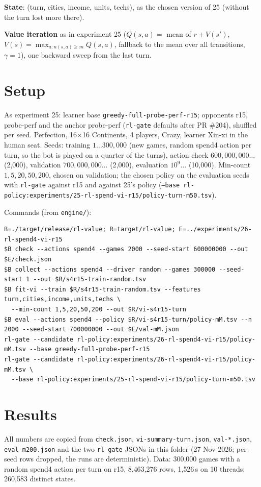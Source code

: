 \documentclass{../polyexp}
\begin{document}
\textbf{State}: (turn, cities, income, units, techs), as the chosen version of 25 (without the turn lost more there).

\textbf{Value iteration} as in experiment 25 ($Q(s,a) = $ mean of $r + V(s')$, $V(s) = \max_{a: n(s,a) \ge m}
Q(s,a)$, fallback to the mean over all transitions, $\gamma = 1$), one backward sweep from the last turn.

\section{Setup}
As experiment 25: learner base \texttt{greedy-full-probe-perf-r15}; opponents r15, probe-perf and the anchor
probe-perf (\texttt{rl-gate} defaults after PR \#204), shuffled per seed. Perfection, 16$\times$16 Continents,
4 players, Crazy, learner Xin-xi in the human seat. Seeds: training $1\dots300{,}000$ (new games, random spend4
action per turn, so the bot is played on a quarter of the turns), action check $600{,}000{,}000\dots$ (2{,}000),
validation $700{,}000{,}000\dots$ (2{,}000), evaluation $10^9\dots$ (10{,}000). Min-count $1, 5, 20, 50, 200$, chosen
on validation; the chosen policy on the evaluation seeds with \texttt{rl-gate} against r15 and against 25's policy
(\texttt{--base rl-policy:experiments/25-rl-spend-vi-r15/policy-turn-m50.tsv}).

Commands (from \texttt{engine/}):
\begin{verbatim}
B=./target/release/rl-value; R=target/rl-value; E=../experiments/26-rl-spend4-vi-r15
$B check --actions spend4 --games 2000 --seed-start 600000000 --out $E/check.json
$B collect --actions spend4 --driver random --games 300000 --seed-start 1 --out $R/s4r15-train-random.tsv
$B fit-vi --train $R/s4r15-train-random.tsv --features turn,cities,income,units,techs \
  --min-count 1,5,20,50,200 --out $R/vi-s4r15-turn
$B eval --actions spend4 --policy $R/vi-s4r15-turn/policy-mM.tsv --n 2000 --seed-start 700000000 --out $E/val-mM.json
rl-gate --candidate rl-policy:experiments/26-rl-spend4-vi-r15/policy-mM.tsv --base greedy-full-probe-perf-r15
rl-gate --candidate rl-policy:experiments/26-rl-spend4-vi-r15/policy-mM.tsv \
  --base rl-policy:experiments/25-rl-spend-vi-r15/policy-turn-m50.tsv
\end{verbatim}

\section{Results}
\ExpResults

All numbers are copied from \texttt{check.json}, \texttt{vi-summary-turn.json}, \texttt{val-*.json},
\texttt{eval-m200.json} and the two \texttt{rl-gate} JSONs in this folder (27 Nov 2026; per-seed rows dropped, the
runs are deterministic). Data: 300{,}000 games with a random spend4 action per turn on r15, 8{,}463{,}276 rows,
1{,}526\,s on 10 threads; 260{,}583 distinct states.
\end{document}
